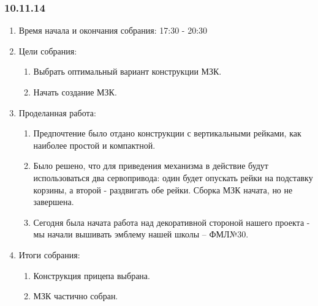 
\subsubsection{10.11.14}

\begin{enumerate} 
	\item Время начала и окончания собрания:
	17:30 - 20:30
	\item Цели собрания:
	\begin{enumerate}
		\item Выбрать оптимальный вариант конструкции МЗК.
		
		\item Начать создание МЗК.
		
	\end{enumerate}
	
	\item Проделанная работа:
	\begin{enumerate}
		\item Предпочтение было отдано конструкции с вертикальными рейками, как наиболее простой и компактной.
		
		\item Было решено, что для приведения механизма в действие будут использоваться два сервопривода: один будет опускать рейки на подставку корзины, а второй - раздвигать обе рейки. Сборка МЗК начата, но не завершена.
		
		\item Сегодня была начата работа над декоративной стороной нашего проекта - мы начали вышивать эмблему нашей школы -- ФМЛ№30.
		
		
	\end{enumerate}
	
	\item Итоги собрания: 
	\begin{enumerate}
		\item Конструкция прицепа выбрана.
		
		\item МЗК частично собран.
		

\end{enumerate}
\end{enumerate}
